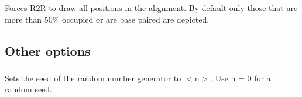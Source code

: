 \subsubsection{} Forces R2R to draw all positions in the alignment. By default only
those that are more than 50\% occupied or are base paired are
depicted.


\subsection{Other options}

\subsubsection{} Sets the seed of the random number generator to $<$n$>$. Use n = 0 for a random seed.










